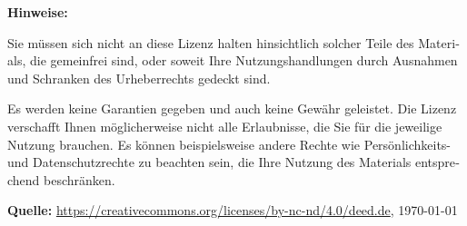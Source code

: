 \begin{otherlanguage}{ngerman}
\medskip

\noindent \textbf{Hinweise:}
{\small
\noindent Sie müssen sich nicht an diese Lizenz halten hinsichtlich solcher Teile des Materials, die gemeinfrei sind, oder soweit Ihre Nutzungshandlungen durch Ausnahmen und Schranken des Urheberrechts gedeckt sind.

\noindent Es werden keine Garantien gegeben und auch keine Gewähr geleistet. Die Lizenz verschafft Ihnen möglicherweise nicht alle Erlaubnisse, die Sie für die jeweilige Nutzung brauchen. Es können beispielsweise andere Rechte wie Persönlichkeits- und Datenschutzrechte zu beachten sein, die Ihre Nutzung des Materials entsprechend beschränken.
}

{\footnotesize
\noindent \textbf{Quelle:} \href{https://creativecommons.org/licenses/by-nc-nd/4.0/deed.de}{https://creativecommons.org/licenses/by-nc-nd/4.0/deed.de}, \today
}

\end{otherlanguage}
